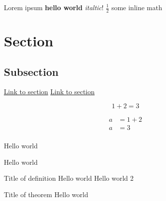Lorem ipsum \textbf{hello world} \textit{italtic}! $\frac12$ some inline math %

\section{Section} 

\subsection{Subsection} %

\hyperref[sec:name]{Link to section} %
\hyperref[subsec:name]{Link to section} %

\[1+2=3\] %

\begin{align*}
    a & = 1 + 2 \\
    a & = 3 \\
\end{align*} %

\begin{minipage}{0.5\textwidth}
Hello world
\end{minipage}
\begin{minipage}{0.5\textwidth}
Hello world
\end{minipage} 

\begin{definition}
{Title of definition}
Hello world
\tcblower
Hello world 2
\end{definition}

\begin{theorem}
{Title of theorem}
Hello world
\end{theorem}

